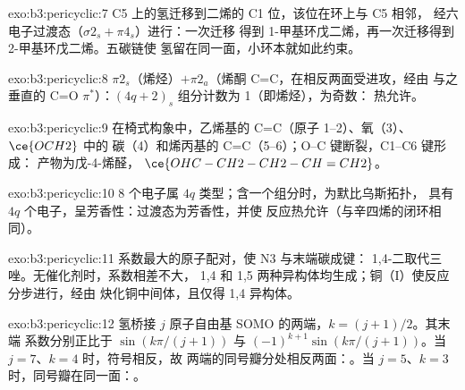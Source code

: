 \begin{solution}{exo:b3:pericyclic:7}
C5 上的氢迁移到二烯的 C1 位，该位在环上与 C5 相邻，
经六电子过渡态（$\sigma2_s + \pi4_s$）进行：一次迁移
得到 1-甲基环戊二烯，再一次迁移得到 2-甲基环戊二烯。五碳链使
氢留在同一面，小环本就如此约束。
\end{solution}

\begin{solution}{exo:b3:pericyclic:8}
$\pi2_s$（烯烃）$+ \pi2_a$（烯酮 C=C，在相反两面受进攻，经由
与之垂直的 C=O $\pi^*$）：$(4q + 2)_s$ 组分计数为 1（即烯烃），为奇数：
热允许。
\end{solution}

\begin{solution}{exo:b3:pericyclic:9}
在椅式构象中，乙烯基的 C=C（原子 1--2）、氧（3）、$\ce{OCH2}$ 中的
碳（4）和烯丙基的 C=C（5--6）；O--C 键断裂，C1--C6 键形成：
产物为戊-4-烯醛，
$\ce{OHC-CH2-CH2-CH=CH2}$。
\end{solution}

\begin{solution}{exo:b3:pericyclic:10}
8 个电子属 $4q$ 类型；含一个组分时，为默比乌斯拓扑，
具有 $4q$ 个电子，呈芳香性：过渡态为芳香性，并使
反应热允许（与辛四烯的闭环相同）。
\end{solution}

\begin{solution}{exo:b3:pericyclic:11}
系数最大的原子配对，使 N3 与末端碳成键：
1,4-二取代三唑。无催化剂时，系数相差不大，
1,4 和 1,5 两种异构体均生成；铜（I）使反应分步进行，经由
炔化铜中间体，且仅得 1,4 异构体。
\end{solution}

\begin{solution}{exo:b3:pericyclic:12}
氢桥接 $j$ 原子自由基 SOMO 的两端，$k = (j + 1)/2$。其末端
系数分别正比于 $\sin(k\pi/(j + 1))$ 与 $(-1)^{k+1}\sin(k\pi/(j + 1))$。当 $j = 7$、$k = 4$ 时，符号相反，故
两端的同号瓣分处相反两面：。当
$j = 5$、$k = 3$ 时，同号瓣在同一面：。
\end{solution}

